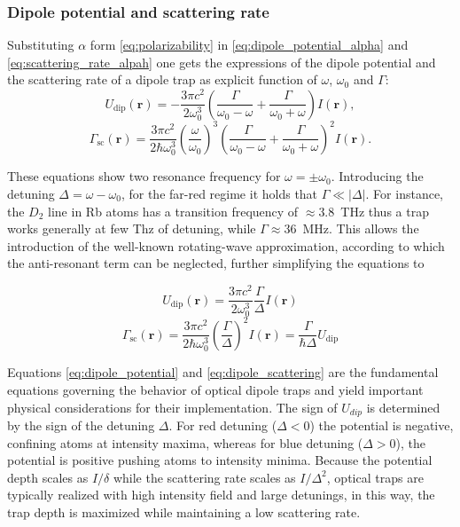 \subsubsection{Dipole potential and scattering rate}
Substituting $\alpha$ form \eqref{eq:polarizability} in \eqref{eq:dipole_potential_alpha} and \eqref{eq:scattering_rate_alpah} one gets the expressions of the dipole potential and the scattering rate of a dipole trap as explicit function of $\omega$, $\omega_0$ and $\Gamma$:
\begin{equation}
    U_{\text{dip}}(\mathbf{r}) = -\frac{3 \pi c^2}{2 \omega_0^3} \left( \frac{\Gamma}{\omega_0 - \omega} + \frac{\Gamma}{\omega_0 + \omega} \right) I(\mathbf{r}),
\end{equation}
\begin{equation}
    \Gamma_{\text{sc}}(\mathbf{r}) = \frac{3 \pi c^2}{2 \hbar \omega_0^3} \left( \frac{\omega}{\omega_0} \right)^3 \left( \frac{\Gamma}{\omega_0 - \omega} + \frac{\Gamma}{\omega_0 + \omega} \right)^2 I(\mathbf{r}).
\end{equation}

These equations show two resonance frequency for $\omega=\pm\omega_0$. Introducing the detuning $\Delta = \omega-\omega_0$, for the far-red regime it holds that $\Gamma\ll|\Delta|$. For instance, the $D_2$ line in Rb atoms has a transition frequency of $\approx3.8$~THz thus a trap works generally at few Thz of detuning, while $\Gamma\approx 36$~MHz. This allows the introduction of the well-known rotating-wave approximation, according to which the anti-resonant term can be neglected, further simplifying the equations to 

\begin{equation}
    \label{eq:dipole_potential}
    U_{\text{dip}}(\mathbf{r}) = \frac{3 \pi c^2}{2 \omega_0^3} \frac{\Gamma}{\Delta} I(\mathbf{r})
\end{equation}
\begin{equation}
    \label{eq:dipole_scattering}
    \Gamma_{\text{sc}}(\mathbf{r}) = \frac{3 \pi c^2}{2 \hbar \omega_0^3} \left( \frac{\Gamma}{\Delta} \right)^2 I(\mathbf{r}) = \frac{\Gamma}{\hbar\Delta}U_\text{dip}
\end{equation}

Equations \eqref{eq:dipole_potential} and \eqref{eq:dipole_scattering} are the fundamental equations governing the behavior of optical dipole traps and yield important physical considerations for their implementation. The sign of $U_{dip}$ is determined by the sign of the detuning $\Delta$. For red detuning ($\Delta<0$) the potential is negative, confining atoms at intensity maxima, whereas for blue detuning ($\Delta>0$), the potential is positive pushing atoms to intensity minima. Because the potential depth scales as $I/\delta$ while the scattering rate scales as $I/\Delta^2$, optical traps are typically realized with high intensity field and large detunings, in this way, the trap depth is maximized while maintaining a low scattering rate.



